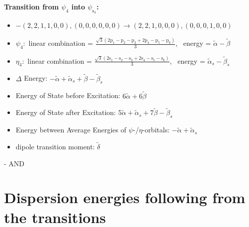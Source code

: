 \documentclass[12pt,a4paper]{article}
\begin{document}
        \noindent\textbf{Transition from $\psi_{4}$ into $\psi_{\text{s}_{4}}$:}
        \begin{itemize}
            \item $- (2, 2, 1, 1, 0, 0), (0, 0, 0, 0, 0, 0) \rightarrow (2, 2, 1, 0, 0, 0), (0, 0, 0, 1, 0, 0)$
        
            \item $\psi_{4}:$ linear combination = $\frac{\sqrt{3} \left(2 \text{p}_{1} - \text{p}_{2} - \text{p}_{3} + 2 \text{p}_{4} - \text{p}_{5} - \text{p}_{6}\right)}{3}$, \
            energy = $\tilde{\alpha} - \tilde{\beta}$
            
            \item $\eta_{4}:$ linear combination = $\frac{\sqrt{3} \left(2 \text{s}_{1} - \text{s}_{2} - \text{s}_{3} + 2 \text{s}_{4} - \text{s}_{5} - \text{s}_{6}\right)}{3}$, \
            energy = $\tilde{\alpha}_{s} - \tilde{\beta}_{s}$
            
                \item $\Delta$ Energy: $- \tilde{\alpha} + \tilde{\alpha}_{s} + \tilde{\beta} - \tilde{\beta}_{s}$
                \item Energy of State before Excitation: $6 \tilde{\alpha} + 6 \tilde{\beta}$
                \item Energy of State after Excitation: $5 \tilde{\alpha} + \tilde{\alpha}_{s} + 7 \tilde{\beta} - \tilde{\beta}_{s}$
                \item Energy between Average Energies of $\psi$-/$\eta$-orbitals: $- \tilde{\alpha} + \tilde{\alpha}_{s}$
            
            \item dipole transition moment: $\tilde{\delta}$
        
        \end{itemize}
        
 -  AND 
\newpage \section*{Dispersion energies following from the transitions}
\end{document}
